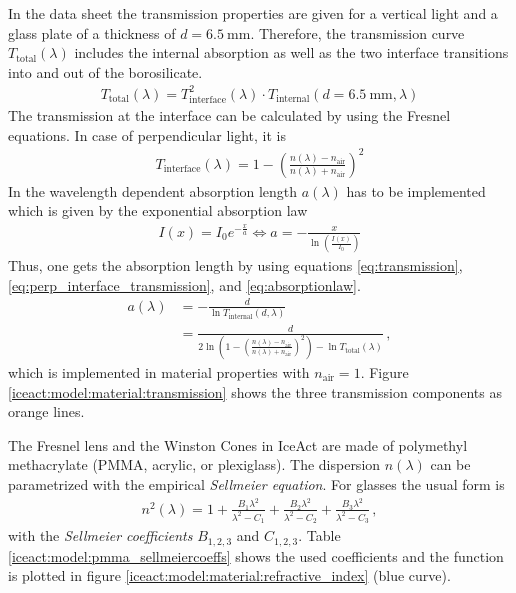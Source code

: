 In the data sheet \cite{iceact:borosilicate:datasheet} the transmission properties are given for a vertical light and a glass plate of a thickness of $d = \SI{6.5}{\milli\meter}$. Therefore, the transmission curve $T_\text{total}(\lambda)$ includes the internal absorption as well as the two interface transitions into and out of the borosilicate.
\begin{align}
	T_\text{total}(\lambda) = T_\text{interface}^2(\lambda)\cdot T_\text{internal}(d=\SI{6.5}{\milli\meter},\lambda)
	\label{eq:transmission}
\end{align}
The transmission at the interface can be calculated by using the Fresnel equations. In case of perpendicular light, it is
\begin{align}
	T_\text{interface}(\lambda) = 1 - \left(\frac{n(\lambda)-n_\text{air}}{n(\lambda)+n_\text{air}}\right)^2
	\label{eq:perp_interface_transmission}
\end{align}
In \geant the wavelength dependent absorption length $a(\lambda)$ has to be implemented which is given by the exponential absorption law
\begin{align}
	I(x) = I_0 e^{-\frac{x}{a}} \Leftrightarrow a = - \frac{x}{\ln\left(\frac{I(x)}{I_0}\right)}
	\label{eq:absorptionlaw}
\end{align}
Thus, one gets the absorption length by using equations \eqref{eq:transmission}, \eqref{eq:perp_interface_transmission}, and \eqref{eq:absorptionlaw}.
\begin{align}
	a(\lambda) &= - \frac{d}{\ln T_\text{internal}(d,\lambda)}\\
	&= \frac{d}{2\ln\left(1 - \left(\frac{n(\lambda)-n_\text{air}}{n(\lambda)+n_\text{air}}\right)^2\right)-\ln T_\text{total}(\lambda)}\,,
\end{align}
which is implemented in \geant material properties with $n_\text{air} = 1$. Figure \ref{iceact:model:material:transmission} shows the three transmission components as orange lines.

The Fresnel lens and the Winston Cones in IceAct are made of polymethyl methacrylate (PMMA, acrylic, or plexiglass). The dispersion $n(\lambda)$ can be parametrized with the empirical \textit{Sellmeier equation}. For glasses the usual form is
\begin{align}
	n^2(\lambda) = 1 + \frac{B_1\lambda^2}{\lambda^2-C_1} + \frac{B_2\lambda^2}{\lambda^2-C_2} + \frac{B_3\lambda^2}{\lambda^2-C_3}\,,
	\label{eq:sellmeier}
\end{align}
with the \textit{Sellmeier coefficients} $B_{1,2,3}$ and $C_{1,2,3}$. \cite{iceact:sellmeier} Table \ref{iceact:model:pmma_sellmeiercoeffs} shows the used coefficients and the function is plotted in figure \ref{iceact:model:material:refractive_index} (blue curve).

